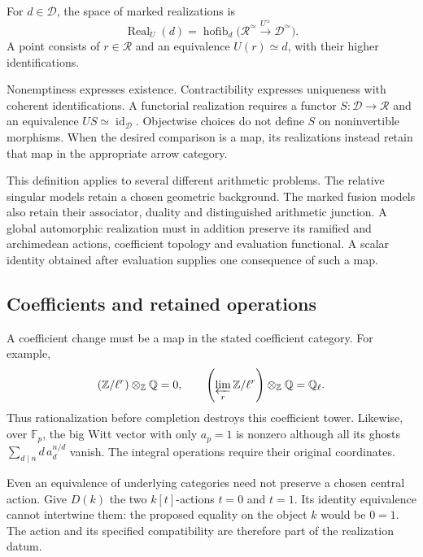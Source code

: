 \begin{definition}\label{v4-arith:ic:marked-realizations}
For \(d\in\mathscr D\), the space of marked realizations is
\[
 \operatorname{Real}_U(d)=
 \operatorname{hofib}_d
 \bigl(\mathscr R^\simeq\xrightarrow{U^\simeq}
       \mathscr D^\simeq\bigr).
\]
A point consists of \(r\in\mathscr R\) and an equivalence
\(U(r)\simeq d\), with their higher identifications.
\end{definition}

Nonemptiness expresses existence. Contractibility expresses uniqueness
with coherent identifications. A functorial realization requires a
functor \(S:\mathscr D\to\mathscr R\) and an equivalence
\(US\simeq\operatorname{id}_{\mathscr D}\).
Objectwise choices do not define \(S\) on noninvertible morphisms.
When the desired comparison is a map, its realizations instead
retain that map in the appropriate arrow category.

This definition applies to several different arithmetic problems.
The relative singular models retain a chosen geometric background.
The marked fusion models also retain their associator, duality and
distinguished arithmetic junction. A global automorphic realization
must in addition preserve its ramified and archimedean actions,
coefficient topology and evaluation functional. A scalar identity
obtained after evaluation supplies one consequence of such a map.

\subsection{Coefficients and retained operations}

A coefficient change must be a map in the stated coefficient category.
For example,
\[
 (\mathbb Z/\ell^r)\otimes_{\mathbb Z}\mathbb Q=0,
 \qquad
 \left(\varprojlim_r\mathbb Z/\ell^r\right)
       \otimes_{\mathbb Z}\mathbb Q=\mathbb Q_\ell.
\]
Thus rationalization before completion destroys this coefficient
tower. Likewise, over \(\mathbb F_p\), the big Witt vector with only
\(a_p=1\) is nonzero although all its ghosts
\(\sum_{d\mid n}d\,a_d^{n/d}\) vanish.
The integral operations require their original coordinates.

Even an equivalence of underlying categories need not preserve a
chosen central action. Give \(D(k)\) the two \(k[t]\)-actions
\(t=0\) and \(t=1\). Its identity equivalence cannot intertwine them:
the proposed equality on the object \(k\) would be \(0=1\).
The action and its specified compatibility are therefore part of
the realization datum.

